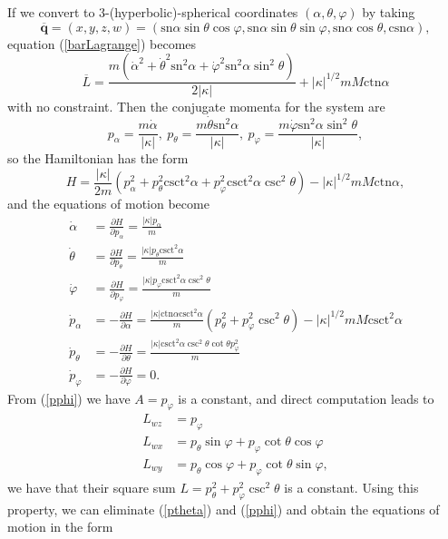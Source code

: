 \documentclass[12pt]{amsart}
\theoremstyle{definition}
\newcommand {\csn} {\text{csn}}
\newcommand {\sn} {\text{sn}}
\newcommand {\ctn} {\text{ctn}}
\newcommand {\csct} {\text{csct}}
\newcommand {\q} {\mathbf{q}}
\begin{document}
{If we convert to 3-(hyperbolic)-spherical coordinates $(\alpha, \theta, \varphi)$ by taking 
$$\overline{\q}= (x,y,z, w)=(\sn{\alpha}\sin{\theta}\cos{\varphi}, \sn{\alpha}\sin{\theta}\sin{\varphi}, \sn{\alpha}\cos{\theta}, \csn{\alpha}),$$
 equation (\ref{barLagrange}) becomes \begin{equation}
\overline{L}=\frac{m(\dot{\alpha}^2+\dot{\theta}^2\sn^2{\alpha}+\dot{\varphi}^2\sn^2{\alpha}\sin^2{\theta})}{2|\kappa|}+|\kappa|^{1/2}mM\ctn{\alpha}\end{equation}
with no constraint. Then the conjugate momenta for the system are 
$$
p_\alpha=\frac{m\dot{\alpha}}{|\kappa|},\
p_\theta=\frac{m\dot{\theta}\sn^2{\alpha}}{|\kappa|},\
p_\varphi=\frac{m\dot{\varphi}\sn^2{\alpha}\sin^2{\theta}}{|\kappa|},
$$
so the Hamiltonian has the form 
\begin{equation}
H=\frac{|\kappa|}{2m}(p_\alpha^2+p_\theta^2\csct^2{\alpha}+p_\varphi^2\csct^2{\alpha}\csc^2{\theta})-|\kappa|^{1/2}mM\ctn{\alpha},\end{equation}
and the equations of motion become
\begin{align}
\dot{\alpha}&=\frac{\partial H}{\partial p_\alpha}=\frac{|\kappa|p_\alpha}{m}\\
\dot{\theta}&=\frac{\partial H}{\partial p_\theta}=\frac{|\kappa|p_\theta\csct^2{\alpha}}{m}\\
\dot{\varphi}&=\frac{\partial H}{\partial p_\varphi}=\frac{|\kappa|p_\varphi\csct^2{\alpha}\csc^2{\theta}}{m}\\
\dot{p}_\alpha&=-\frac{\partial H}{\partial \alpha}=\frac{|\kappa|\ctn{\alpha}\csct^2{\alpha}}{m}(p_\theta^2+p_\varphi^2\csc^2{\theta})-|\kappa|^{1/2}mM\csct^2{\alpha}\\
\dot{p}_\theta&=-\frac{\partial H}{\partial \theta}=\frac{|\kappa|\csct^2{\alpha}\csc^2{\theta}\cot{\theta}p_\varphi^2}{m}\label{ptheta}\\
\dot{p}_\varphi&=-\frac{\partial H}{\partial \varphi}=0.\label{pphi}
\end{align}
From (\ref{pphi}) we have $A=p_\varphi$ is a constant, and direct computation leads to
\begin{align*}
L_{wz} &= p_\varphi\\
L_{wx} &= p_\theta \sin{\varphi}+p_\varphi \cot{\theta} \cos{\varphi}\\
L_{wy} &= p_\theta \cos{\varphi}+p_\varphi \cot{\theta} \sin{\varphi},
\end{align*} we have that their square sum $L=p_\theta^2+p_\varphi^2\csc^2{\theta}$ is a constant. Using this property, we can eliminate (\ref{ptheta}) and (\ref{pphi}) and obtain the equations of motion in the form
}
\end{document}
